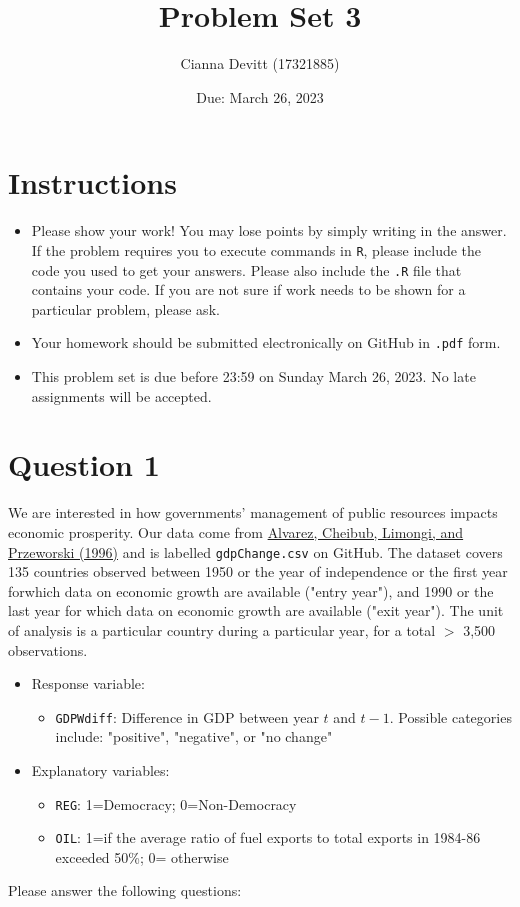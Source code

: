 \documentclass[12pt,letterpaper]{article}
\title{Problem Set 3}
\date{Due: March 26, 2023}
\author{Cianna Devitt (17321885)}
\begin{document}
	\maketitle
	\section*{Instructions}
	\begin{itemize}
	\item Please show your work! You may lose points by simply writing in the answer. If the problem requires you to execute commands in \texttt{R}, please include the code you used to get your answers. Please also include the \texttt{.R} file that contains your code. If you are not sure if work needs to be shown for a particular problem, please ask.
\item Your homework should be submitted electronically on GitHub in \texttt{.pdf} form.
\item This problem set is due before 23:59 on Sunday March 26, 2023. No late assignments will be accepted.
	\end{itemize}

	\vspace{.25cm}
\section*{Question 1}
\vspace{.25cm}
\noindent We are interested in how governments' management of public resources impacts economic prosperity. Our data come from \href{https://www.researchgate.net/profile/Adam_Przeworski/publication/240357392_Classifying_Political_Regimes/links/0deec532194849aefa000000/Classifying-Political-Regimes.pdf}{Alvarez, Cheibub, Limongi, and Przeworski (1996)} and is labelled \texttt{gdpChange.csv} on GitHub. The dataset covers 135 countries observed between 1950 or the year of independence or the first year forwhich data on economic growth are available ("entry year"), and 1990 or the last year for which data on economic growth are available ("exit year"). The unit of analysis is a particular country during a particular year, for a total $>$ 3,500 observations. 

\begin{itemize}
	\item
	Response variable: 
	\begin{itemize}
		\item \texttt{GDPWdiff}: Difference in GDP between year $t$ and $t-1$. Possible categories include: "positive", "negative", or "no change"
	\end{itemize}
	\item
	Explanatory variables: 
	\begin{itemize}
		\item
		\texttt{REG}: 1=Democracy; 0=Non-Democracy
		\item
		\texttt{OIL}: 1=if the average ratio of fuel exports to total exports in 1984-86 exceeded 50\%; 0= otherwise
	\end{itemize}
	
\end{itemize}
\newpage
\noindent Please answer the following questions:
\end{document}
